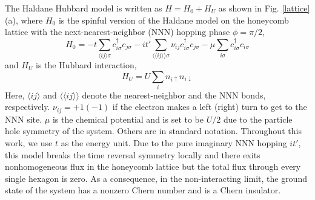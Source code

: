 \documentclass[12pt]{iopart}
\begin{document}
\par The Haldane Hubbard model is written as $H=H_0+H_U$ as shown in Fig. \ref{lattice}(a), where $H_0$ is the spinful version of the Haldane model on the honeycomb lattice with the next-nearest-neighbor (NNN) hopping phase $\phi=\pi/2$\cite{H_PRL1988},
\begin{equation}\label{H0}
  H_0=-t\sum_{\langle ij\rangle\sigma}c^{\dagger}_{i\sigma}c_{j\sigma}-it'\sum_{\langle\langle ij\rangle\rangle\sigma}\nu_{ij}c^{\dagger}_{i\sigma}c_{j\sigma}-\mu \sum_{i\sigma}c^{\dagger}_{i\sigma}c_{i\sigma}
\end{equation}
and $H_U$ is the Hubbard interaction,
\begin{equation}\label{HU}
  H_U=U\sum_i n_{i\uparrow}n_{i\downarrow}
\end{equation}
Here, $\langle ij\rangle$ and $\langle\langle ij\rangle\rangle$ denote the nearest-neighbor and the NNN bonds, respectively. $\nu_{ij}=+1 (-1)$ if the electron makes a left (right) turn to get to the NNN site. $\mu$ is the chemical potential and is set to be $U/2$ due to the particle hole symmetry of the system. Others are in standard notation. Throughout this work, we use $t$ as the energy unit. Due to the pure imaginary NNN hopping $it'$, this model breaks the time reversal symmetry locally and there exits nonhomogeneous flux in the honeycomb lattice but the total flux through every single hexagon is zero. As a consequence, in the non-interacting limit, the ground state of the system has a nonzero Chern number and is a Chern insulator.
\end{document}
